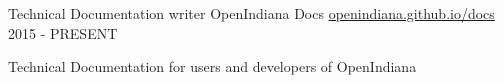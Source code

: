 


\begin{cventries}


\cventry
{Technical Documentation writer} %
{OpenIndiana Docs} %
{\href{https://openindiana.github.io/oi-docs/}{openindiana.github.io/docs}} %
{2015 - PRESENT} %
{ %
\begin{cvitems}
\item {Technical Documentation for users and developers of OpenIndiana}
\end{cvitems}
}



\end{cventries}
